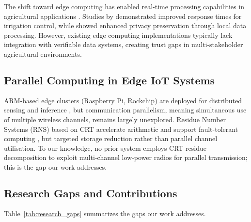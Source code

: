 \documentclass[pdflatex,sn-mathphys-num]{sn-jnl}
\theoremstyle{thmstyleone}
\theoremstyle{thmstyletwo}
\theoremstyle{thmstylethree}
\begin{document}
The shift toward edge computing has enabled real-time processing capabilities in agricultural applications \cite{sharma2020edge}. Studies by \cite{liu2019edge} demonstrated improved response times for irrigation control, while \cite{wang2021edge} showed enhanced privacy preservation through local data processing. However, existing edge computing implementations typically lack integration with verifiable data systems, creating trust gaps in multi-stakeholder agricultural environments.

\subsection{Parallel Computing in Edge IoT Systems}
\label{subsec:parallel_edge}

ARM-based edge clusters (Raspberry Pi, Rockchip) are deployed for distributed sensing and inference \cite{sharma2020edge, wang2021edge}, but communication parallelism, meaning simultaneous use of multiple wireless channels, remains largely unexplored. Residue Number Systems (RNS) based on CRT \cite{parhami2010computer} accelerate arithmetic and support fault-tolerant computing \cite{ding1996remainder, shoup2009computational}, but \cite{wang2018novel} targeted storage reduction rather than parallel channel utilisation. To our knowledge, no prior system employs CRT residue decomposition to exploit multi-channel low-power radios for parallel transmission; this is the gap our work addresses.

\subsection{Research Gaps and Contributions}
\label{subsec:research_gaps}

Table~\ref{tab:research_gaps} summarizes the gaps our work addresses.
\end{document}

